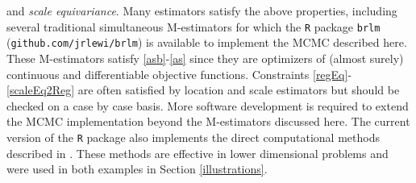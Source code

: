 \documentclass[ba]{imsart}
\makeatletter
\def\bbeta{\mbox{\boldmath $\beta$}}
\newcommand{\by}{\mbox{\boldmath $y$}}
\newcommand{\bv}{\mbox{\boldmath $v$}}
\newcommand{\bb}{\mbox{\boldmath $b$}}
\newcommand{\response}[1]{{\color{blue}#1}}
\newcommand{\labitem}[2]{%
\def\@itemlabel{\textbf{#1}{.}}
\item
\def\@currentlabel{#1}\label{#2}}
\makeatother
\begin{document}
and \textit{scale equivariance}. 
Many estimators satisfy the above properties, including several traditional simultaneous M-estimators \citep{huber2009, maronna2006} for which the \texttt{R} package \texttt{brlm} (\texttt{github.com/jrlewi/brlm}) is available to implement the MCMC described here. \response{These M-estimators satisfy \ref{asb}-\ref{as} since they are optimizers of (almost surely) continuous and differentiable objective functions. Constraints  \ref{regEq}-\ref{scaleEq2Reg} are often satisfied by location and scale estimators but should be checked on a case by case basis.}  More software development is required to extend the MCMC implementation beyond the M-estimators discussed here. The current version of the \texttt{R} package also implements the direct computational methods described in \cite{lewis2014}. These methods are effective in lower dimensional problems and were used in both examples in Section \ref{illustrations}.


%
\end{document}
